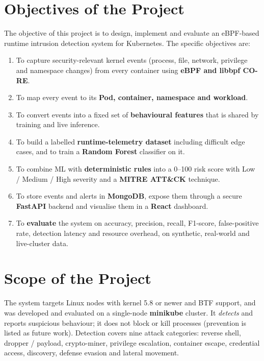\section{Objectives of the Project}

The objective of this project is to design, implement and evaluate an eBPF-based
runtime intrusion detection system for Kubernetes. The specific objectives are:
\begin{enumerate}
    \item To capture security-relevant kernel events (process, file, network, privilege
          and namespace changes) from every container using \textbf{eBPF and libbpf
          CO-RE}.
    \item To map every event to its \textbf{Pod, container, namespace and workload}.
    \item To convert events into a fixed set of \textbf{behavioural features} that is shared
          by training and live inference.
    \item To build a labelled \textbf{runtime-telemetry dataset} including difficult edge
          cases, and to train a \textbf{Random Forest} classifier on it.
    \item To combine ML with \textbf{deterministic rules} into a 0--100 risk score with
          Low / Medium / High severity and a \textbf{MITRE ATT\&CK} technique.
    \item To store events and alerts in \textbf{MongoDB}, expose them through a secure
          \textbf{FastAPI} backend and visualise them in a \textbf{React} dashboard.
    \item To \textbf{evaluate} the system on accuracy, precision, recall, F1-score,
          false-positive rate, detection latency and resource overhead, on synthetic,
          real-world and live-cluster data.
\end{enumerate}

\section{Scope of the Project}

The system targets Linux nodes with kernel 5.8 or newer and BTF support, and was
developed and evaluated on a single-node \textbf{minikube} cluster. It \emph{detects}
and reports suspicious behaviour; it does not block or kill processes (prevention is
listed as future work). Detection covers nine attack categories: reverse shell,
dropper / payload, crypto-miner, privilege escalation, container escape, credential
access, discovery, defense evasion and lateral movement.

